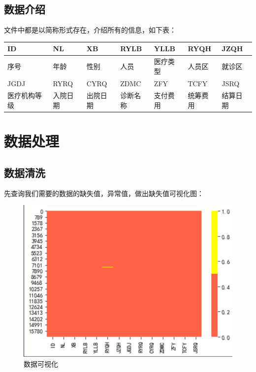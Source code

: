 \documentclass[12pt]{article}
\begin{document}
\subsection{数据介绍}
文件中都是以简称形式存在，介绍所有的信息，如下表：
\begin{table}[!ht]
    \centering
    \begin{tabular}{|l|l|l|l|l|l|l|}
    \hline
        ID & NL & XB & RYLB & YLLB & RYQH & JZQH  \\ \hline
        序号 & 年龄 & 性别 & 人员 & 医疗类型 & 人员区 & 就诊区\\ \hline
        JGDJ & RYRQ & CYRQ & ZDMC & ZFY & TCFY & JSRQ\\ \hline
        医疗机构等级 & 入院日期 & 出院日期 & 诊断名称 & 支付费用 & 统筹费用 & 结算日期\\ \hline
    \end{tabular}
\end{table}

\section{数据处理}

\subsection{数据清洗}

先查询我们需要的数据的缺失值，异常值，做出缺失值可视化图：
\begin{figure}[ht]
\centering
\includegraphics[scale=0.8]{figures/2.png}
\caption{数据可视化}\label{fig:label2}
\end{figure}
\end{document}
